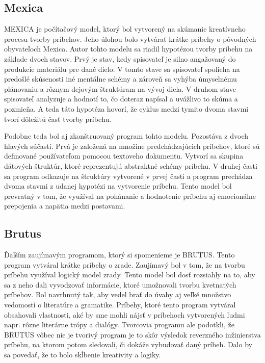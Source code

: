 \subsection{Mexica}
MEXICA je počítačový model, ktorý bol vytvorený na skúmanie kreatívneho procesu tvorby príbehov. Jeho úlohou bolo vytvárať krátke príbehy o pôvodných obyvateľoch Mexica. Autor tohto modelu sa riadil hypotézou tvorby príbehu na základe dvoch stavov. Prvý je stav, kedy spisovateľ je silno angažovaný do produkcie materiálu pre dané dielo. V tomto stave sa spisovateľ spolieha na predošlé skúsenosti iné mentálne schémy a zároveň sa vyhýba úmyselnému plánovaniu a rôznym dejovým štruktúram na vývoj diela. V druhom stave spisovateľ analyzuje a hodnotí to, čo doteraz napísal a uvážlivo to skúma a pozmieňa. A teda táto hypotéza hovorí, že cyklus medzi tymito dvoma stavmi tvorí dôležitú časť tvorby príbehu.\par
Podobne teda bol aj zkonštruovaný program tohto modelu. Pozostáva z dvoch hlavých súčastí. Prvá je založená na množine predchádzajúcich príbehov, ktoré sú definované používateľom pomocou textoveho dokumentu. Vytvorí sa skupina dátových štruktúr, ktoré reprezentujú abstraktné schémy príbehu. V druhej časti sa program odkazuje na štruktúry vytvorené v prvej časti a program prechádza dvoma stavmi z udanej hypotézi na vytvorenie príbehu. Tento model bol prevratný v tom, že využíval na pohánanie a hodnotenie príbehu aj emocionálne prepojenia a napätia medzi postavami.
\subsection{Brutus}
Ďaľším zaujímavým programom, ktorý si spomenieme je BRUTUS. Tento program vytváral krátke príbehy o zrade. Zaujímavý bol v tom, že na tvorbu príbehu využíval logický model zrady. Tento model bol dosť rozsiahly na to, aby sa z neho dali vyvodzovať informácie, ktoré umožnovali tvorbu kvetnatých príbehov. Bol navrhnutý tak, aby vedel brať do úvahy aj veľké množstvo vedomostí o literatúre a gramatike. Príbehy, ktoré tento program vytváral obsahovali vlastnosti, aké by sme mohli nájsť v príbehoch vytvorených ľudmi napr. rôzne literárne trópy a dialógy. Tvorcovia programu ale podotkli, že BRUTUS vôbec nie je tvorivý program je to skôr výsledok reverzného inžinierstva príbehu, na ktorom potom sledovali, či dokáže vybudovať daný príbeh. Dalo by sa povedať, že to bolo skĺbenie kreativity a logiky.
